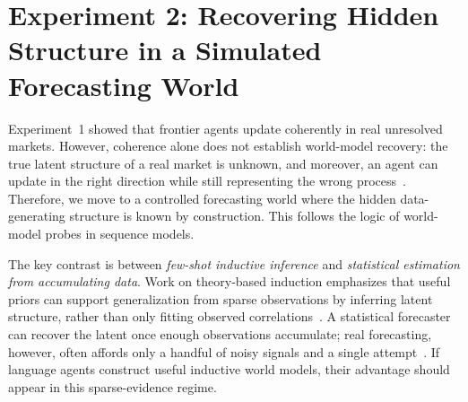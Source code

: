 \documentclass{article} %
\begin{document}
\section{Experiment 2: Recovering Hidden Structure in a Simulated Forecasting World}
\label{sec:exp2}
Experiment~1 showed that frontier agents update coherently in real unresolved markets. However, coherence alone does not establish world-model recovery: the true latent structure of a real market is unknown, and moreover, an agent can update in the right direction while still representing the wrong process~\citep{vafa2025foundation}.
Therefore, we move to a controlled forecasting world where the hidden data-generating structure is known by construction.
This follows the logic of world-model probes in sequence models.

The key contrast is between \emph{few-shot inductive inference} and \emph{statistical estimation from accumulating data}.
Work on theory-based induction emphasizes that useful priors can support generalization from sparse observations by inferring latent structure, rather than only fitting observed correlations~\citep{tenenbaum2006theory,griffiths2010probabilistic,tenenbaum2011mind,lake2017building}.
A statistical forecaster can recover the latent once enough observations accumulate; real forecasting, however, often affords only a handful of noisy signals and a single attempt~\citep{tetlock2016superforecasting,mellers2014psychological,lawrence2006judgmental}.
If language agents construct useful inductive world models, their advantage should appear in this sparse-evidence regime.
\end{document}
